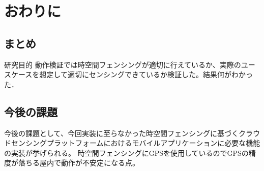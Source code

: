 \chapter{おわりに}
\thispagestyle{myheadings}

\section{まとめ}
研究目的
動作検証では時空間フェンシングが適切に行えているか、実際のユースケースを想定して適切にセンシングできているか検証した。結果何がわかった．

\section{今後の課題}
今後の課題として、今回実装に至らなかった時空間フェンシングに基づくクラウドセンシングプラットフォームにおけるモバイルアプリケーションに必要な機能の実装が挙げられる。
時空間フェンシングにGPSを使用しているのでGPSの精度が落ちる屋内で動作が不安定になる点。


